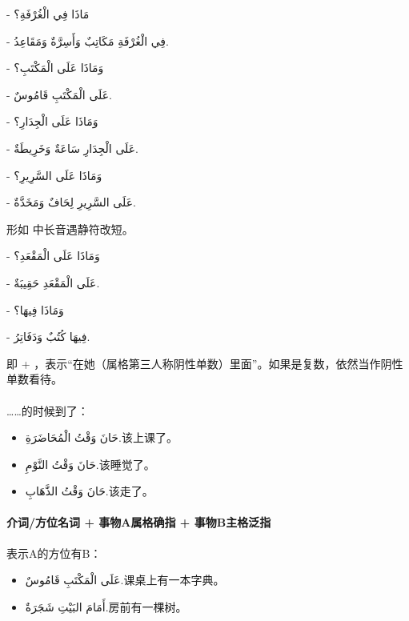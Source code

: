 \begin{Arabic}
    - مَاذَا فِي الْغُرْفَةِ؟

    - فِي الْغُرْفَةِ مَكَاتِبٌ وَأَسِرَّةٌ وَمَقَاعِدُ.

    - وَمَاذَا عَلَى الْمَكْتَبِ؟

    - عَلَى الْمَكْتَبِ قَامُوسٌ.

    - وَمَاذَا عَلَى الْجِدَارِ؟

    - عَلَى الْجِدَارِ سَاعَةٌ وَخَرِيطَةٌ.

    - وَمَاذَا عَلَى السَّرِيرِ؟

    - عَلَى السَّرِيرِ لِحَافٌ وَمَخَدَّةٌ.

\end{Arabic}

\begin{attention}
    形如  中长音遇静符改短。
\end{attention}

\begin{Arabic}
    - وَمَاذَا عَلَى الْمَقْعَدِ؟

    - عَلَى الْمَقْعَدِ حَقِيبَةٌ.

    - وَمَاذَا فِيهَا؟

    - فِيهَا كُتُبٌ وَدَفَاتِرُ.
\end{Arabic}

\begin{attention}
     即  +  ，表示``在她（属格第三人称阴性单数）里面''。如果是复数，依然当作阴性单数看待。
\end{attention}

\paragraph{} ……的时候到了：
\begin{itemize}
    \item \ac{حَانَ وَقْتُ الْمُحَاضَرَةِ.}{该上课了。}
    \item \ac{حَانَ وَقْتُ النَّوْمِ.}{该睡觉了。}
    \item \ac{حَانَ وَقْتُ الذَّهَابِ.}{该走了。}
\end{itemize}

\paragraph{介词/方位名词 + 事物A属格确指 + 事物B主格泛指} 表示A的方位有B：
\begin{itemize}
    \item \ac{عَلَى الْمَكْتَبِ قَامُوسٌ.}{课桌上有一本字典。}
    \item \ac{أَمَامَ البَيْتِ شَجَرَةٌ.}{房前有一棵树。}
\end{itemize}

